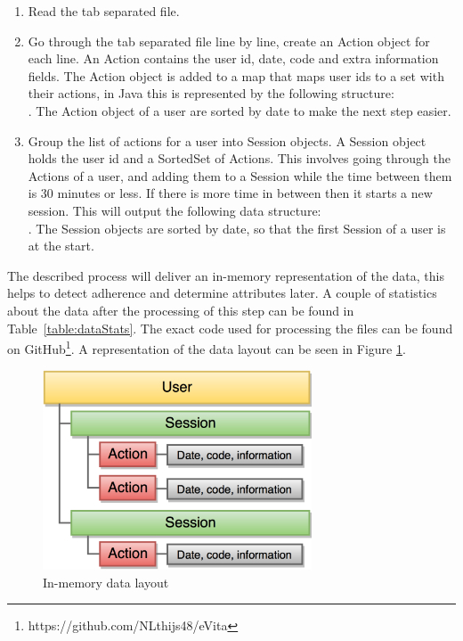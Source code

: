 \begin{enumerate}
	\item Read the tab separated file.
	\item Go through the tab separated file line by line, create an Action object for each line. An Action contains the user id, date, code and extra information fields. The Action object is added to a map that maps user ids to a set with their actions, in Java this is represented by the following structure:\\ . The Action object of a user are sorted by date to make the next step easier.
	\item Group the list of actions for a user into Session objects. A Session object holds the user id and a SortedSet of Actions. This involves going through the Actions of a user, and adding them to a Session while the time between them is 30 minutes or less. If there is more time in between then it starts a new session. This will output the following data structure:\\ . The Session objects are sorted by date, so that the first Session of a user is at the start.
\end{enumerate}

The described process will deliver an in-memory representation of the data, this helps to detect adherence and determine attributes later. A couple of statistics about the data after the processing of this step can be found in Table~\ref{table:dataStats}. The exact code used for processing the files can be found on GitHub\footnote{https://github.com/NLthijs48/eVita}. A representation of the data layout can be seen in Figure \ref{figure:dataLayout}.

\begin{figure}[!h]
	\centering
	\includegraphics[width=80mm]{dataSmall.png}
	\caption{In-memory data layout}
	\label{figure:dataLayout}
\end{figure}

